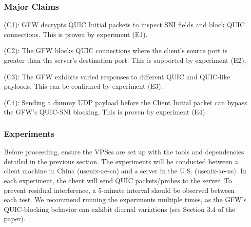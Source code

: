 \subsubsection{Major Claims}

\begin{compactdesc}
    \item[(C1):] GFW decrypts QUIC Initial packets to inspect SNI fields and block QUIC connections.
    This is proven by experiment (E1).
    \item[(C2):] The GFW blocks QUIC connections where the client's
    source port is greater than the server's destination port.
    This is supported by experiment (E2).
    \item[(C3):] The GFW exhibits varied responses to different QUIC and QUIC-like payloads. This can be 
    confirmed by experiment (E3). 
    \item[(C4):] Sending a dummy UDP payload before the Client
    Initial packet can bypass the GFW's QUIC-SNI blocking. This is proven by experiment (E4).

\end{compactdesc}

\subsubsection{Experiments}

Before proceeding, ensure the VPSes
are set up with the tools and dependencies detailed in
the previous section. The experiments will be conducted between a
client machine in China (usenix-ae-cn) and a server in the U.S. (usenix-ae-us).
In each experiment, the client will send QUIC packets/probes to the server.
To prevent residual interference, a 5-minute interval should be observed between
each test. We recommend running the experiments multiple times, as
the GFW's QUIC-blocking behavior can exhibit diurnal variations (see Section 3.4 of the paper).

